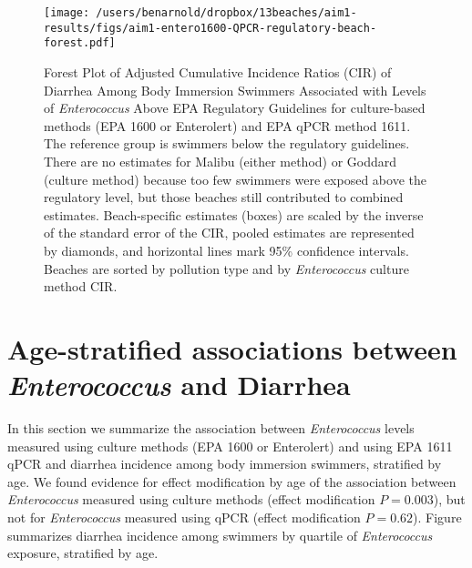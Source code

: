 \documentclass[12pt]{article}\usepackage[]{graphicx}\usepackage[]{color}
\begin{document}
\begin{landscape}
\begin{figure}[h!tb]
\begin{center}
\texttt{[image: /users/benarnold/dropbox/13beaches/aim1-results/figs/aim1-entero1600-QPCR-regulatory-beach-forest.pdf]}
\caption{Forest Plot of Adjusted Cumulative Incidence Ratios (CIR) of Diarrhea Among Body Immersion Swimmers Associated with  Levels of \emph{Enterococcus} Above EPA Regulatory Guidelines for culture-based methods (EPA 1600 or Enterolert) and EPA qPCR method 1611. The reference group is swimmers below the regulatory guidelines. There are no estimates for Malibu (either method) or Goddard (culture method) because too few swimmers were exposed above the regulatory level, but those beaches still contributed to combined estimates. Beach-specific estimates (boxes) are scaled by the inverse of the standard error of the CIR, pooled estimates are represented by diamonds, and horizontal lines mark 95\% confidence intervals. Beaches are sorted by pollution type and by \textit{Enterococcus} culture method CIR.\label{fig:enteroregforest}}
\end{center}
\end{figure}
\end{landscape}

\clearpage
\section{Age-stratified associations between \emph{Enterococcus} and Diarrhea}

In this section we summarize the association between \emph{Enterococcus} levels measured using culture methods (EPA 1600 or Enterolert) and using EPA 1611 qPCR and diarrhea incidence among body immersion swimmers, stratified by age.  We found evidence for effect modification by age of the association between \textit{Enterococcus} measured using culture methods (effect modification $P=0.003$), but not for \textit{Enterococcus} measured using qPCR (effect modification $P=0.62$).  Figure  \label{fig:enteroage} summarizes diarrhea incidence among swimmers by quartile of \textit{Enterococcus} exposure, stratified by age.
\end{document}

